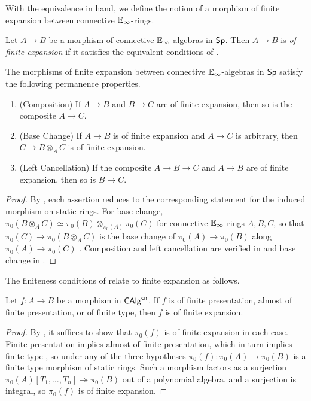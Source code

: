 With the equivalence in hand, we define the notion of a morphism of finite expansion between connective $\mathbb{E}_{\infty}$-rings.
\begin{definition}\label{def: finite expansion appendix}
    Let $A\to B$ be a morphism of connective $\mathbb{E}_{\infty}$-algebras in $\mathsf{Sp}$. Then $A\to B$ is \emph{of finite expansion} if it satisfies the equivalent conditions of .
\end{definition}
\begin{proposition}\label{prop: finite expansion permanence}
    The morphisms of finite expansion between connective $\mathbb{E}_{\infty}$-algebras in $\mathsf{Sp}$ satisfy the following permanence properties.
    \begin{enumerate}
        \item (Composition) If $A\to B$ and $B\to C$ are of finite expansion, then so is the composite $A\to C$.
        \item (Base Change) If $A\to B$ is of finite expansion and $A\to C$ is arbitrary, then $C\to B\otimes_{A} C$ is of finite expansion.
        \item (Left Cancellation) If the composite $A\to B\to C$ and $A\to B$ are of finite expansion, then so is $B\to C$.
    \end{enumerate}
\end{proposition}
\begin{proof}
    By , each assertion reduces to the corresponding statement for the induced morphism on static rings. For base change, $\pi_{0}(B\otimes_{A}C)\simeq\pi_{0}(B)\otimes_{\pi_{0}(A)}\pi_{0}(C)$ for connective $\mathbb{E}_{\infty}$-rings $A,B,C$, so that $\pi_{0}(C)\to\pi_{0}(B\otimes_{A}C)$ is the base change of $\pi_{0}(A)\to\pi_{0}(B)$ along $\pi_{0}(A)\to\pi_{0}(C)$ \cite[Cor. 7.2.1.23]{HA}. Composition and left cancellation are verified in \cite[Lem. 1.3 (1)]{FiniteExpansion} and base change in \cite[Lem. 1.3 (3)]{FiniteExpansion}. 
\end{proof}
The finiteness conditions of  relate to finite expansion as follows.
\begin{lemma}\label{lem: finiteness implies finite expansion}
    Let $f:A\to B$ be a morphism in $\mathsf{CAlg}^{\mathsf{cn}}$. If $f$ is of finite presentation, almost of finite presentation, or of finite type, then $f$ is of finite expansion.
\end{lemma}
\begin{proof}
    By , it suffices to show that $\pi_{0}(f)$ is of finite expansion in each case. Finite presentation implies almost of finite presentation, which in turn implies finite type \cite[\S 4.1]{SAG}, so under any of the three hypotheses $\pi_{0}(f):\pi_{0}(A)\to\pi_{0}(B)$ is a finite type morphism of static rings. Such a morphism factors as a surjection $\pi_{0}(A)[T_{1},\dots,T_{n}]\twoheadrightarrow\pi_{0}(B)$ out of a polynomial algebra, and a surjection is integral, so $\pi_{0}(f)$ is of finite expansion.
\end{proof}
